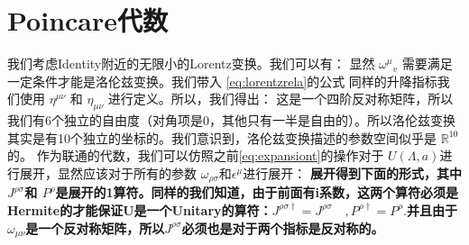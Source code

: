 \section{Poincare代数}
我们考虑Identity附近的无限小的Lorentz变换。我们可以有：
显然 $ \omega^\mu{}_v $ 需要满足一定条件才能是洛伦兹变换。我们带入 \cref{eq:lorentzrela}的公式
同样的升降指标我们使用 $ \eta^{\mu\nu} $ 和 $ \eta_{\mu\nu} $ 进行定义。所以，我们得出：
这是一个四阶反对称矩阵，所以我们有6个独立的自由度（对角项是0，其他只有一半是自由的）。所以洛伦兹变换其实是有10个独立的坐标的。我们意识到，洛伦兹变换描述的参数空间似乎是 $ \mathbb{R}^{10} $的。 作为联通的代数，我们可以仿照之前\cref{eq:expansiont}的操作对于 $ U(\Lambda,a) $进行展开，显然应该对于所有的参数 $ \omega_{\rho\sigma} $和$ \epsilon^\mu $进行展开：
\textbf{展开得到下面的形式，其中 $ J^{\rho\sigma} $和 $ P^\rho $是展开的1算符。同样的我们知道，由于前面有i系数，这两个算符必须是Hermite的才能保证U是一个Unitary的算符：$ J^{\rho\sigma\dagger}=J^{\rho\sigma}\quad, P^{\rho\dagger}=P^{\rho}. $并且由于 $ \omega_{\mu\nu} $是一个反对称矩阵，所以$ J^{\rho\sigma} $必须也是对于两个指标是反对称的。}

